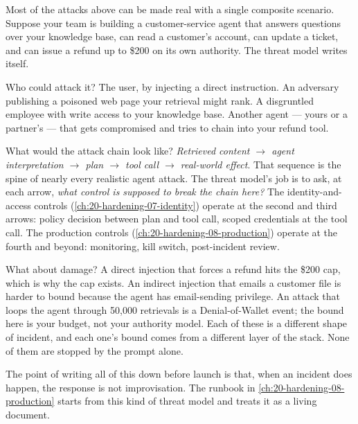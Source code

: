 Most of the attacks above can be made real with a single composite scenario. Suppose your team is building a customer-service agent that answers questions over your knowledge base, can read a customer's account, can update a ticket, and can issue a refund up to \$200 on its own authority. The threat model writes itself.

Who could attack it? The user, by injecting a direct instruction. An adversary publishing a poisoned web page your retrieval might rank. A disgruntled employee with write access to your knowledge base. Another agent --- yours or a partner's --- that gets compromised and tries to chain into your refund tool.

What would the attack chain look like? \textit{Retrieved content $\rightarrow$ agent interpretation $\rightarrow$ plan $\rightarrow$ tool call $\rightarrow$ real-world effect}. That sequence is the spine of nearly every realistic agent attack. The threat model's job is to ask, at each arrow, \textit{what control is supposed to break the chain here?} The identity-and-access controls (\autoref{ch:20-hardening-07-identity}) operate at the second and third arrows: policy decision between plan and tool call, scoped credentials at the tool call. The production controls (\autoref{ch:20-hardening-08-production}) operate at the fourth and beyond: monitoring, kill switch, post-incident review.

What about damage? A direct injection that forces a refund hits the \$200 cap, which is why the cap exists. An indirect injection that emails a customer file is harder to bound because the agent has email-sending privilege. An attack that loops the agent through 50,000 retrievals is a Denial-of-Wallet event; the bound here is your budget, not your authority model. Each of these is a different shape of incident, and each one's bound comes from a different layer of the stack. None of them are stopped by the prompt alone.

The point of writing all of this down before launch is that, when an incident does happen, the response is not improvisation. The runbook in \autoref{ch:20-hardening-08-production} starts from this kind of threat model and treats it as a living document.

\TNrule

\stoptwocol

